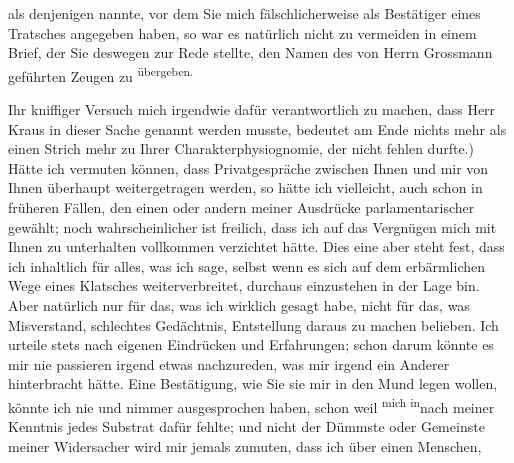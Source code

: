                als denjenigen nannte, vor dem Sie mich fälschlicherweise als Bestätiger eines
               Tratsches angegeben haben, so war es natürlich nicht zu vermeiden in einem Brief, der
               Sie deswegen zur Rede stellte, den Namen des von Herrn Grossmann geführten Zeugen zu \substVorne{}\textsuperscript{übergeben.}\substDazwischen{}\label{T_L02019-1v}\label{T_L02019-1}\substHinten{}\pend
           
\pstart
           Ihr kniffiger Versuch mich irgendwie dafür verantwortlich zu machen, dass Herr Kraus in dieser Sache genannt werden musste,
               bedeutet am Ende nichts mehr als einen Strich mehr zu Ihrer Charakterphysiognomie,
               der nicht fehlen durfte.) Hätte ich vermuten können, dass Privatgespräche zwischen
               Ihnen und mir von Ihnen überhaupt weitergetragen werden, so hätte ich vielleicht,
               auch schon in früheren Fällen, den einen oder
               andern meiner Ausdrücke parlamentarischer gewählt; noch wahrscheinlicher ist
               freilich, dass ich auf das Vergnügen mich mit Ihnen zu unterhalten vollkommen
               verzichtet hätte. Dies eine aber steht fest, dass ich inhaltlich für alles, was ich
               sage, selbst wenn es {\pb}sich auf dem erbärmlichen Wege eines
               Klatsches weiterverbreitet, durchaus einzustehen in der Lage bin. Aber natürlich nur
               für das, was ich wirklich gesagt habe, nicht für das, was Misverstand, schlechtes
               Gedächtnis, Entstellung daraus zu machen belieben. Ich urteile stets nach eigenen
               Eindrücken und Erfahrungen; schon darum könnte es mir nie passieren irgend etwas
               nachzureden, was mir irgend ein Anderer hinterbracht hätte. Eine Bestätigung, wie Sie
               sie mir in den Mund legen wollen, könnte ich nie und nimmer ausgesprochen haben,
               schon weil \substVorne{}\textsuperscript{mich in}\substDazwischen{}nach\substHinten{} meiner Kenntnis jedes Substrat dafür fehlte; und nicht der Dümmste oder
               Gemeinste meiner Widersacher wird mir jemals zumuten, dass ich über einen Menschen,
